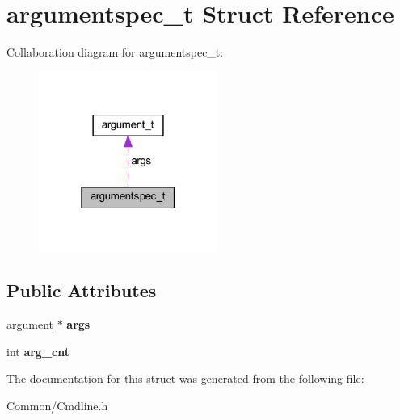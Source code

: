 \hypertarget{structargumentspec__t}{}\section{argumentspec\+\_\+t Struct Reference}
\label{structargumentspec__t}


Collaboration diagram for argumentspec\+\_\+t\+:
\nopagebreak
\begin{figure}[H]
\begin{center}
\leavevmode
\includegraphics[width=166pt]{structargumentspec__t__coll__graph}
\end{center}
\end{figure}
\subsection*{Public Attributes}
\begin{DoxyCompactItemize}
\item 
\mbox{\label{structargumentspec__t_a2086f1bd418fc6030924a16927da3dd8}} 
\hyperlink{structargument__t}{argument} $\ast$ {\bfseries args}
\item 
\mbox{\label{structargumentspec__t_a89dc5d9a1bc7a502506585d21e7d3acc}} 
int {\bfseries arg\+\_\+cnt}
\end{DoxyCompactItemize}


The documentation for this struct was generated from the following file\+:\begin{DoxyCompactItemize}
\item 
Common/Cmdline.\+h\end{DoxyCompactItemize}
